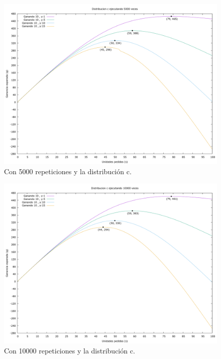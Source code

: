 \documentclass[12pt, spanish]{article}
\begin{document}
\begin{figure}[H]
	\centering
	\includegraphics[scale = 0.2]{prob_c/datos_c_5000.png}
	\caption{Con 5000 repeticiones y la distribución c.}
	\label{fig:ej1_a_5000}

\end{figure}


\begin{figure}[H]
	\centering
	\includegraphics[scale = 0.2]{prob_c/datos_c_10000.png}
	\caption{Con 10000 repeticiones y la distribución c.}
	\label{fig:ej1_a_10000}

\end{figure}
\end{document}
